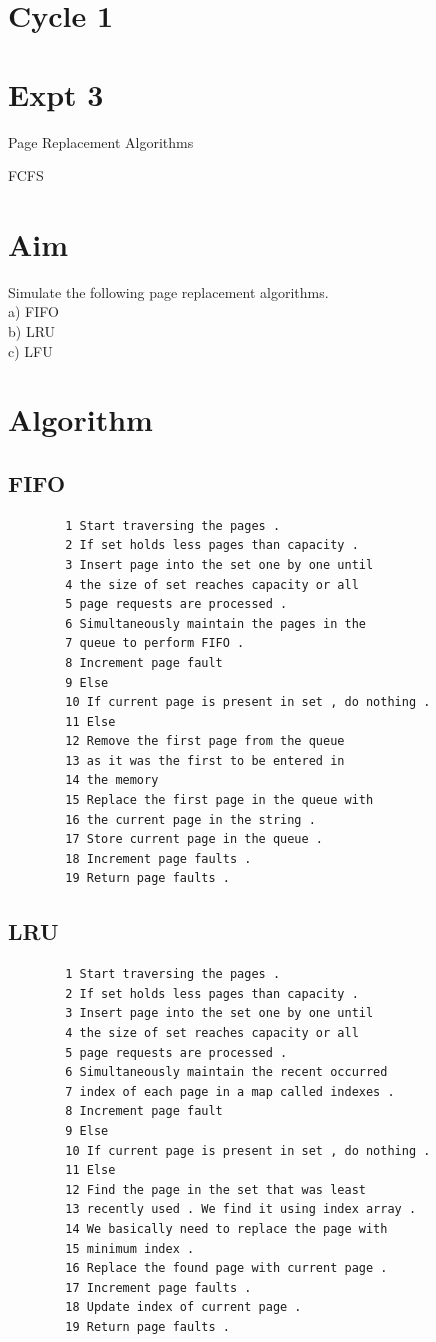 \documentclass[13pt,oneside]{book}
\begin{document}
\section*{Cycle 1}
\section*{Expt 3}
\begin{center}
    \Large{Page Replacement Algorithms}
\end{center}FCFS
\section*{Aim}
\large
Simulate the following page replacement algorithms.\\
a) FIFO\\
b) LRU \\
c) LFU \\

\section*{Algorithm}
    \subsection*{FIFO}
    \begin{verbatim}
		1 Start traversing the pages .
		2 If set holds less pages than capacity .
		3 Insert page into the set one by one until
		4 the size of set reaches capacity or all
		5 page requests are processed .
		6 Simultaneously maintain the pages in the
		7 queue to perform FIFO .
		8 Increment page fault
		9 Else
		10 If current page is present in set , do nothing .
		11 Else
		12 Remove the first page from the queue
		13 as it was the first to be entered in
		14 the memory
		15 Replace the first page in the queue with
		16 the current page in the string .
		17 Store current page in the queue .
		18 Increment page faults .
		19 Return page faults .
    \end{verbatim}  
    \subsection*{LRU}
    \begin{verbatim}
        1 Start traversing the pages .
		2 If set holds less pages than capacity .
		3 Insert page into the set one by one until
		4 the size of set reaches capacity or all
		5 page requests are processed .
		6 Simultaneously maintain the recent occurred
		7 index of each page in a map called indexes .
		8 Increment page fault
		9 Else
		10 If current page is present in set , do nothing .
		11 Else
		12 Find the page in the set that was least
		13 recently used . We find it using index array .
		14 We basically need to replace the page with
		15 minimum index .
		16 Replace the found page with current page .
		17 Increment page faults .
		18 Update index of current page .
		19 Return page faults .
    \end{verbatim}
\end{document}
